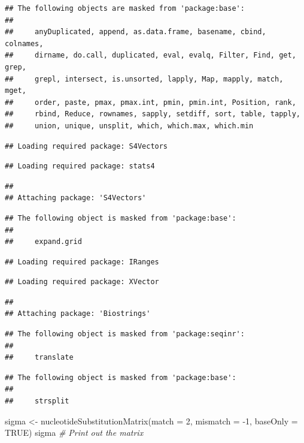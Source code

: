 \documentclass[
]{book}
\newenvironment{Shaded}{\begin{snugshade}}{\end{snugshade}}
\newcommand{\AttributeTok}[1]{\textcolor[rgb]{0.77,0.63,0.00}{#1}}
\newcommand{\CommentTok}[1]{\textcolor[rgb]{0.56,0.35,0.01}{\textit{#1}}}
\newcommand{\ConstantTok}[1]{\textcolor[rgb]{0.00,0.00,0.00}{#1}}
\newcommand{\DecValTok}[1]{\textcolor[rgb]{0.00,0.00,0.81}{#1}}
\newcommand{\FunctionTok}[1]{\textcolor[rgb]{0.00,0.00,0.00}{#1}}
\newcommand{\NormalTok}[1]{#1}
\newcommand{\OtherTok}[1]{\textcolor[rgb]{0.56,0.35,0.01}{#1}}
\newcommand{\SpecialCharTok}[1]{\textcolor[rgb]{0.00,0.00,0.00}{#1}}
\begin{document}
\begin{verbatim}
## The following objects are masked from 'package:base':
## 
##     anyDuplicated, append, as.data.frame, basename, cbind, colnames,
##     dirname, do.call, duplicated, eval, evalq, Filter, Find, get, grep,
##     grepl, intersect, is.unsorted, lapply, Map, mapply, match, mget,
##     order, paste, pmax, pmax.int, pmin, pmin.int, Position, rank,
##     rbind, Reduce, rownames, sapply, setdiff, sort, table, tapply,
##     union, unique, unsplit, which, which.max, which.min
\end{verbatim}

\begin{verbatim}
## Loading required package: S4Vectors
\end{verbatim}

\begin{verbatim}
## Loading required package: stats4
\end{verbatim}

\begin{verbatim}
## 
## Attaching package: 'S4Vectors'
\end{verbatim}

\begin{verbatim}
## The following object is masked from 'package:base':
## 
##     expand.grid
\end{verbatim}

\begin{verbatim}
## Loading required package: IRanges
\end{verbatim}

\begin{verbatim}
## Loading required package: XVector
\end{verbatim}

\begin{verbatim}
## 
## Attaching package: 'Biostrings'
\end{verbatim}

\begin{verbatim}
## The following object is masked from 'package:seqinr':
## 
##     translate
\end{verbatim}

\begin{verbatim}
## The following object is masked from 'package:base':
## 
##     strsplit
\end{verbatim}

\begin{Shaded}
\begin{Highlighting}[]
\NormalTok{sigma }\OtherTok{\textless{}{-}} \FunctionTok{nucleotideSubstitutionMatrix}\NormalTok{(}\AttributeTok{match =} \DecValTok{2}\NormalTok{, }
                                      \AttributeTok{mismatch =} \SpecialCharTok{{-}}\DecValTok{1}\NormalTok{, }
                                      \AttributeTok{baseOnly =} \ConstantTok{TRUE}\NormalTok{)}
\NormalTok{sigma }\CommentTok{\# Print out the matrix}
\end{Highlighting}
\end{Shaded}
\end{document}
